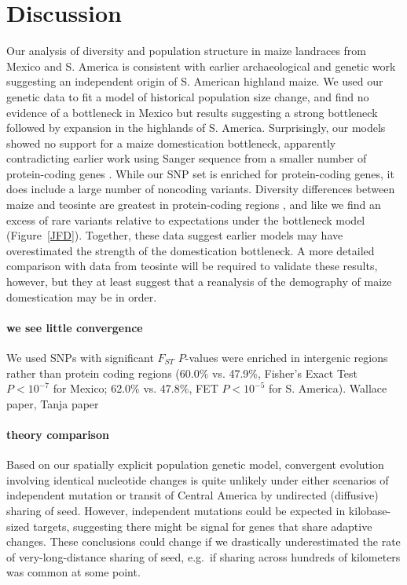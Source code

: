 \section*{Discussion}

Our analysis of diversity and population structure in maize landraces from Mexico and S. America is consistent with earlier archaeological \cite[]{Piperno_2006_69,Perry_2006_16511492,Grobman_2012_22307642} and genetic \citep{vanHeerwaarden_2011_21189301} work suggesting an independent origin of S. American highland maize. 
We used our genetic data to fit a model of historical population size change, and find no evidence of a bottleneck in Mexico but results suggesting a strong bottleneck followed by expansion in the highlands of S. America. 
Surprisingly, our models showed no support for a maize domestication bottleneck, apparently contradicting earlier work using Sanger sequence from a smaller number of protein-coding genes \cite[]{Eyre-Walker_1998_9539756,Tenaillon_2004_15014173,Wright_2005_15919994}. 
While our SNP set is enriched for protein-coding genes, it does include a large number of noncoding variants.
Diversity differences between maize and teosinte are greatest in protein-coding regions \citep{Hufford_2012_22660546}, and like \citet{Hufford_2012_22660546} we find an excess of rare variants relative to expectations under the \cite{Wright_2005_15919994} bottleneck model (Figure~\ref{JFD}).
Together, these data suggest earlier models may have overestimated the strength of the domestication bottleneck.
A more detailed comparison with data from teosinte will be required  to validate these results, however, but they at least suggest that a reanalysis of the demography of maize domestication may be in order.

\paragraph{we see little convergence}
We used SNPs with significant $F_{ST}$ $P$-values were enriched in intergenic regions rather than protein coding regions (60.0\% vs. 47.9\%, Fisher's Exact Test $P < 10^{-7}$ for Mexico; 62.0\% vs. 47.8\%, FET $P<10^{-5}$ for S. America). 
Wallace paper, Tanja paper

\paragraph{theory comparison}
Based on our spatially explicit population genetic model, convergent evolution involving identical nucleotide changes is quite unlikely under either scenarios of independent mutation or transit of Central America by undirected (diffusive) sharing of seed. 
However, independent mutations could be expected in kilobase-sized targets, suggesting there might be signal for genes that share adaptive changes.
These conclusions could change if we drastically underestimated the rate of very-long-distance sharing of seed, e.g.\ if sharing across hundreds of kilometers was common at some point.


